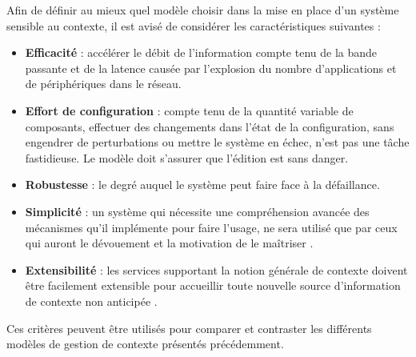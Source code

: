 Afin de définir au mieux quel modèle choisir dans la mise en place d'un système
sensible au contexte, il est avisé de considérer les caractéristiques suivantes
:

\begin{itemize}
    \item \textbf{Efficacité} : 
        accélérer le débit de l'information compte tenu de la bande passante
        et de la latence causée par l'explosion du nombre d'applications et
        de périphériques dans le réseau.
    \item \textbf{Effort de configuration} : 
        compte tenu de la quantité variable de composants, effectuer des
        changements dans l'état de la configuration, sans engendrer de
        perturbations ou mettre le système en échec, n'est pas une tâche
        fastidieuse. Le modèle doit s'assurer que l'édition est sans danger.
    \item \textbf{Robustesse} : 
        le degré auquel le système peut faire face à la défaillance.
    \item \textbf{Simplicité} : 
            un système qui nécessite une compréhension avancée des mécanismes
            qu'il implémente pour faire l'usage, ne sera utilisé que par ceux
            qui auront le dévouement et la motivation de le maîtriser
            \cite{winograd_architectures_2001}.
    \item \textbf{Extensibilité} : 
            les services supportant la notion générale de contexte doivent
            être facilement extensible pour accueillir toute nouvelle source
            d'information de contexte non anticipée \cite{ebling_issues_2001}.
\end{itemize}

Ces critères peuvent être utilisés pour comparer et contraster les différents
modèles de gestion de contexte présentés précédemment.

